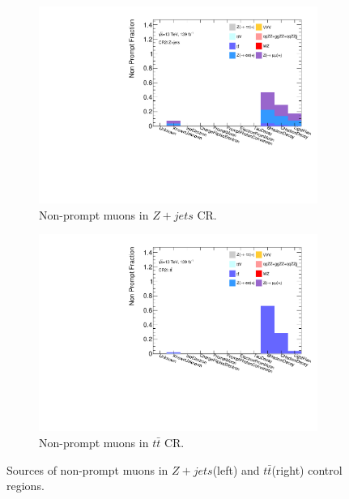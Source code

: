 \begin{figure}[!htbp]
    \begin{subfigure}{.49\textwidth}
        \centering
        \includegraphics[width=.9\linewidth]{figures/Analysis/Background/NonPromptComposition_ZplusX_Muon.pdf}
        \caption{Non-prompt muons in $Z+jets$ CR.}
    \end{subfigure}
    \begin{subfigure}{.49\textwidth}
        \centering
        \includegraphics[width=.9\linewidth]{figures/Analysis/Background/NonPromptComposition_ttbar_Muons.pdf}
        \caption{Non-prompt muons in $t\bar{t}$ CR.}
    \end{subfigure}
        \caption{ Sources of non-prompt muons in $Z+jets$(left) and $t\bar{t}$(right) control regions.\label{fig:FakeCompositionCR2LMuon}}
\end{figure}

